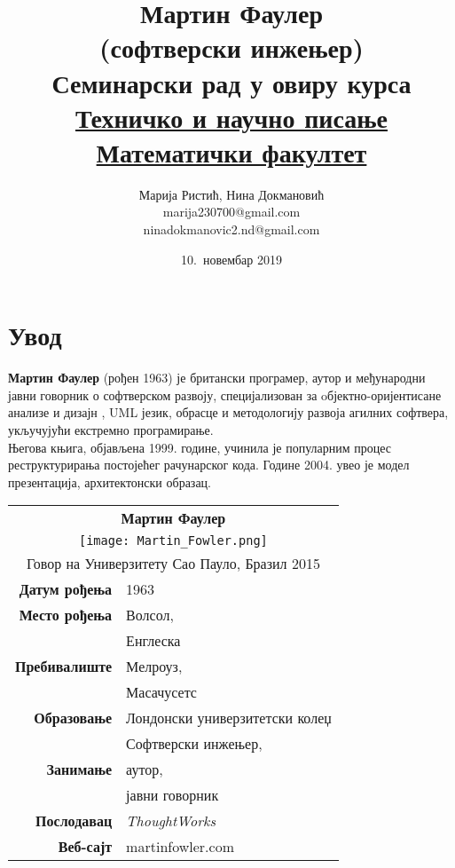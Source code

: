 \documentclass[12pt,a4paper]{article}
\begin{document}
\title{\textbf{Мартин Фаулер \\(софтверски инжењер)}\\ \small{Семинарски рад у овиру курса\\ \href{http://www.itkomunikacija.matf.bg.ac.rs/TehnickoINaucnoPisanje.html}{Техничко и научно писање}\\\href{http://www.matf.bg.ac.rs/}{Математички факултет}}}
\author{Марија Ристић, Нина Докмановић\\marija230700@gmail.com\\ninadokmanovic2.nd@gmail.com}
\date{10.~новембар 2019}

\maketitle
\tableofcontents
\newpage

\section{{Увод}}
\label{sec:uvod}
\textbf{Мартин Фаулер} (рођен 1963) је британски програмер, аутор и међународни јавни говорник о софтверском развоју, специјализован за oбјектно-оријентисане анализе и дизајн , UML језик, обрасце и методологију развоја агилних софтвера, укључујући екстремно програмирање. \\Његова књига, објављена 1999. године, учинила је популарним процес реструктурирања постојећег рачунарског кода\cite{k_1}. Године 2004. увео је модел презентација, архитектонски образац.\cite{k_2}

\begin{center}
\begin{tabular}{|r|l|}\hline
    \multicolumn{2}{|c|}{\textbf{Мартин Фаулер}}\\
    \multicolumn{2}{|c|}{\texttt{[image: Martin\_Fowler.png]}} \\
    \multicolumn{2}{|c|}{Говор на Универзитету Сао Пауло, Бразил 2015}\\ \hline
    \textbf{Датум рођења} & 1963 \\ \cline{2-2}
    \textbf{Место рођења} & Волсол, \\
     &  Енглеска \\ \cline{2-2}
     \textbf{Пребивалиште} & Мелроуз, \\
      & Масачусетс \\ \cline{2-2}
     \textbf{Образовање} & Лондонски универзитетски колеџ \\ \cline{2-2}
     & Софтверски инжењер, \\
     \textbf{ Занимање} & аутор, \\
      & јавни говорник \\ \cline{2-2}
     \textbf{Послодавац} & \emph{ThoughtWorks} \\ \cline{2-2}
     \textbf{Веб-сајт}	& 	martinfowler.com \\ \hline
\end{tabular}
\end{center}
\end{document}

